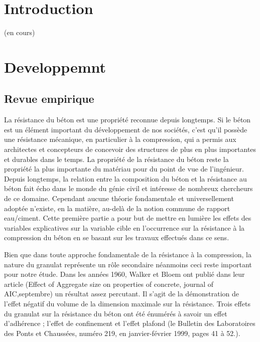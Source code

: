 \documentclass[
  12pt,
]{article}
\title{\fbox{\huge Regression Linéaire}}
\author{Dimitri DELPECH, \and Timothé FADENIPO, \and Matthis
ARVOIS, \and Ismael MADOU GAGI GREMA, \and Cheikh LO}
\date{2025-04-08}
\begin{document}
\maketitle

{
\setcounter{tocdepth}{2}
\tableofcontents
}
\listoffigures

\listoftables

\newpage

\section{Introduction}\label{introduction}

(en cours)

\section{Developpemnt}\label{developpemnt}

\subsection{Revue empirique}\label{revue-empirique}

La résistance du béton est une propriété reconnue depuis longtemps. Si
le béton est un élément important du développement de nos sociétés,
c'est qu'il possède une résistance mécanique, en particulier à la
compression, qui a permis aux architectes et concepteurs de concevoir
des structures de plus en plus importantes et durables dans le temps. La
propriété de la résistance du béton reste la propriété la plus
importante du matériau pour du point de vue de l'ingénieur. Depuis
longtemps, la relation entre la composition du béton et la résistance au
béton fait écho dans le monde du génie civil et intéresse de nombreux
chercheurs de ce domaine. Cependant aucune théorie fondamentale et
universellement adoptée n'existe, en la matière, au-delà de la notion
commune de rapport eau/ciment. Cette première partie a pour but de
mettre en lumière les effets des variables explicatives sur la variable
cible en l'occurrence sur la résistance à la compression du béton en se
basant sur les travaux effectués dans ce sens.

Bien que dans toute approche fondamentale de la résistance à la
compression, la nature du granulat représente un rôle secondaire
néanmoins ceci reste important pour notre étude. Dans les années 1960,
Walker et Bloem ont publié dans leur article (Effect of Aggregate size
on properties of concrete, journal of AIC,septembre) un résultat assez
percutant. Il s'agit de la démonstration de l'effet négatif du volume de
la dimension maximale sur la résistance. Trois effets du granulat sur la
résistance du béton ont été énumérés à savoir un effet d'adhérence ;
l'effet de confinement et l'effet plafond (le Bulletin des Laboratoires
des Ponts et Chaussées, numéro 219, en janvier-février 1999, pages 41 à
52.).
\end{document}
